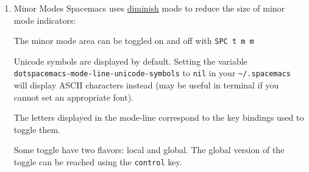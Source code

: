 \documentclass[11pt]{article}
\begin{document}
\begin{enumerate}
\item Minor Modes
\label{sec:orga4f3aaa}
Spacemacs uses \href{http://www.emacswiki.org/emacs/DiminishedModes}{diminish} mode to reduce the size of minor mode indicators:

The minor mode area can be toggled on and off with \texttt{SPC t m m}

Unicode symbols are displayed by default. Setting the variable
\texttt{dotspacemacs-mode-line-unicode-symbols} to \texttt{nil} in your \texttt{\textasciitilde{}/.spacemacs} will
display ASCII characters instead (may be useful in terminal if you cannot set an
appropriate font).

The letters displayed in the mode-line correspond to the key bindings used to
toggle them.

Some toggle have two flavors: local and global. The global version of the toggle
can be reached using the \texttt{control} key.


\end{enumerate}
\end{document}
